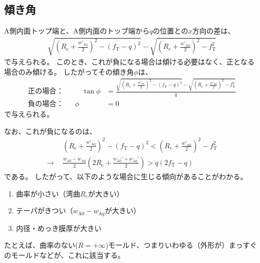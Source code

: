 \subsection{傾き角}
A側内面トップ端と、A側内面のトップ端から$q$の位置との$x$方向の差は、
\begin{align*}
  \sqrt{\left(R_\mathrm c+\frac{w'_{\mathrm Aq}}2\right)^{\!\!2}-(f_\mathrm T-q)^2}
  -\sqrt{\left(R_\mathrm c+\frac{w'_{\mathrm A0}}2\right)^{\!\!2}-f_\mathrm T^2}
\end{align*}
で与えられる。
このとき、これが負になる場合は傾ける必要はなく、正となる場合のみ傾ける。
したがってその傾き角$\phi$は、
\begin{subequations}
\label{eq:dKatamuki}
\begin{alignat}{2}
  \text{正の場合：}&&\quad
  \tan\phi
  &= \frac{\displaystyle
           \sqrt{\left(R_\mathrm c+\frac{w'_{\mathrm Aq}}2\right)^{\!\!2}-(f_\mathrm T-q)^2}
           -\sqrt{\left(R_\mathrm c+\frac{w'_{\mathrm A0}}2\right)^{\!\!2}-f_\mathrm T^2}}q\\[8pt]
  \text{負の場合：}&&
  \phi
  &= 0
\end{alignat}
\end{subequations}
で与えられる。
\begin{hosoku}
なお、これが負になるのは、
\begin{align*}
  & \left(R_\mathrm c+\frac{w'_{\mathrm Aq}}2\right)^{\!\!2}-(f_\mathrm T-q)^2
    < \left(R_\mathrm c+\frac{w'_{\mathrm A0}}2\right)^{\!\!2}-f_\mathrm T^2\\
  \longrightarrow~~
  & \frac{w_{\mathrm A0}-w_{\mathrm Aq}}2
    \left(2R_\mathrm c+\frac{w_{\mathrm A0}'+w_{\mathrm Aq}'}2\right)
    > q(2f_\mathrm T-q)
\end{align*}
である。
したがって、以下のような場合に生じる傾向があることがわかる。
\begin{enumerate}
\item 曲率が小さい（湾曲$R_\mathrm c$が大きい）
\item テーパがきつい（$w_{\mathrm A0}-w_{\mathrm Aq}$が大きい）
\item 内径・めっき膜厚が大きい
\end{enumerate}
たとえば、曲率のない($R = +\infty$)モールド、つまりいわゆる（外形が）まっすぐのモールドなどが、これに該当する。
\end{hosoku}
